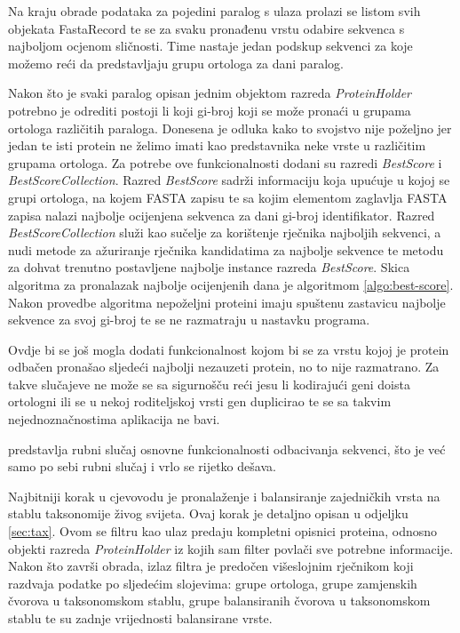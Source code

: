 Na kraju obrade podataka za pojedini paralog s ulaza prolazi se listom svih
objekata FastaRecord te se za svaku pronađenu vrstu odabire sekvenca s najboljom
ocjenom sličnosti. Time nastaje jedan podskup sekvenci za koje možemo reći da
predstavljaju grupu ortologa za dani paralog.

Nakon što je svaki paralog opisan jednim objektom razreda \emph{ProteinHolder}
potrebno je odrediti postoji li koji gi-broj koji se može pronaći u grupama
ortologa različitih paraloga. Donesena je odluka kako to svojstvo nije poželjno
jer jedan te isti protein ne želimo imati kao predstavnika neke vrste u
različitim grupama ortologa. Za potrebe ove funkcionalnosti dodani su razredi
\emph{BestScore} i \emph{BestScoreCollection}. Razred \emph{BestScore} sadrži
informaciju koja upućuje u kojoj se grupi ortologa, na kojem FASTA zapisu te sa
kojim elementom zaglavlja FASTA zapisa nalazi najbolje ocijenjena sekvenca za
dani gi-broj identifikator. Razred \emph{BestScoreCollection} služi kao sučelje
za korištenje rječnika najboljih sekvenci, a nudi metode za ažuriranje rječnika
kandidatima za najbolje sekvence te metodu za dohvat trenutno postavljene
najbolje instance razreda \emph{BestScore}. Skica algoritma za pronalazak
najbolje ocijenjenih dana je algoritmom \ref{algo:best-score}. Nakon provedbe
algoritma nepoželjni proteini imaju spuštenu zastavicu najbolje sekvence za svoj
gi-broj te se ne razmatraju u nastavku programa.



Ovdje bi se još mogla dodati funkcionalnost kojom bi se za vrstu kojoj je
protein odbačen pronašao sljedeći najbolji nezauzeti protein, no to nije
razmatrano. Za takve slučajeve ne može se sa sigurnošču reći jesu li kodirajući
geni doista ortologni ili se u nekoj roditeljskoj vrsti gen duplicirao te se sa
takvim nejednoznačnostima aplikacija ne bavi.

predstavlja rubni slučaj osnovne funkcionalnosti odbacivanja
sekvenci, što je već samo po sebi rubni slučaj i vrlo se rijetko dešava.

Najbitniji korak u cjevovodu je pronalaženje i balansiranje zajedničkih vrsta na
stablu taksonomije živog svijeta. Ovaj korak je detaljno opisan u odjeljku
\ref{sec:tax}. Ovom se filtru kao ulaz predaju kompletni opisnici proteina,
odnosno objekti razreda \emph{ProteinHolder} iz kojih sam filter povlači sve
potrebne informacije. Nakon što završi obrada, izlaz filtra je predočen
višeslojnim rječnikom koji razdvaja podatke po sljedećim slojevima: grupe
ortologa, grupe zamjenskih čvorova u taksonomskom stablu, grupe balansiranih
čvorova u taksonomskom stablu te su zadnje vrijednosti balansirane vrste.

